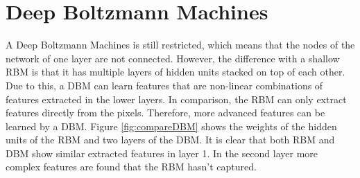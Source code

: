 \documentclass[a4paper,10pt]{article}
\begin{document}
\section{Deep Boltzmann Machines}
A Deep Boltzmann Machines is still restricted, which means that the nodes of the network of one layer are not connected. However, the difference with a shallow RBM is that it has multiple layers of hidden units stacked on top of each other. Due to this, a DBM can learn features that are non-linear combinations of features extracted in the lower layers. In comparison, the RBM can only extract features directly from the pixels. Therefore, more advanced features can be learned by a DBM. Figure \ref{fig:compareDBM} shows the weights of the hidden units of the RBM and two layers of the DBM. It is clear that both RBM and DBM show similar extracted features in layer 1. In the second layer more complex features are found that the RBM hasn't captured.
\end{document}
